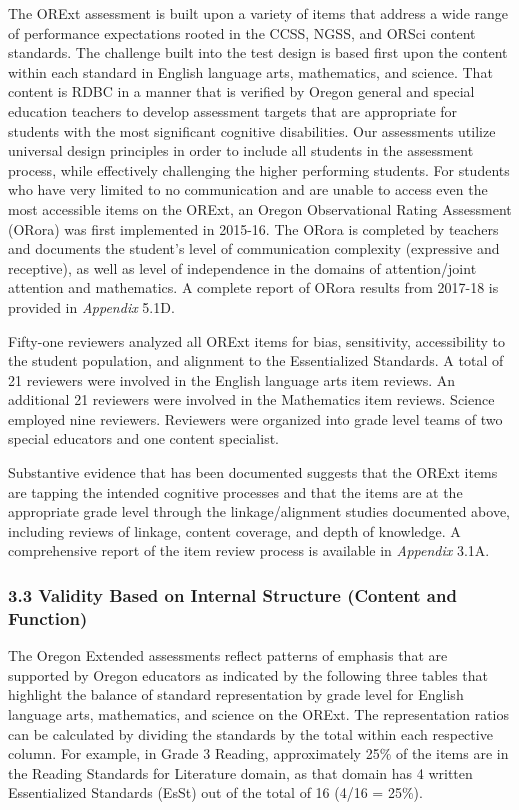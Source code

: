 \documentclass[]{article}
\begin{document}
The ORExt assessment is built upon a variety of items that address a
wide range of performance expectations rooted in the CCSS, NGSS, and
ORSci content standards. The challenge built into the test design is
based first upon the content within each standard in English language
arts, mathematics, and science. That content is RDBC in a manner that is
verified by Oregon general and special education teachers to develop
assessment targets that are appropriate for students with the most
significant cognitive disabilities. Our assessments utilize universal
design principles in order to include all students in the assessment
process, while effectively challenging the higher performing students.
For students who have very limited to no communication and are unable to
access even the most accessible items on the ORExt, an Oregon
Observational Rating Assessment (ORora) was first implemented in
2015-16. The ORora is completed by teachers and documents the student's
level of communication complexity (expressive and receptive), as well as
level of independence in the domains of attention/joint attention and
mathematics. A complete report of ORora results from 2017-18 is provided
in \emph{Appendix} 5.1D.

Fifty-one reviewers analyzed all ORExt items for bias, sensitivity,
accessibility to the student population, and alignment to the
Essentialized Standards. A total of 21 reviewers were involved in the
English language arts item reviews. An additional 21 reviewers were
involved in the Mathematics item reviews. Science employed nine
reviewers. Reviewers were organized into grade level teams of two
special educators and one content specialist.

Substantive evidence that has been documented suggests that the ORExt
items are tapping the intended cognitive processes and that the items
are at the appropriate grade level through the linkage/alignment studies
documented above, including reviews of linkage, content coverage, and
depth of knowledge. A comprehensive report of the item review process is
available in \emph{Appendix} 3.1A.

\subsubsection{3.3 Validity Based on Internal Structure (Content and
Function)}\label{validity-based-on-internal-structure-content-and-function}

The Oregon Extended assessments reflect patterns of emphasis that are
supported by Oregon educators as indicated by the following three tables
that highlight the balance of standard representation by grade level for
English language arts, mathematics, and science on the ORExt. The
representation ratios can be calculated by dividing the standards by the
total within each respective column. For example, in Grade 3 Reading,
approximately 25\% of the items are in the Reading Standards for
Literature domain, as that domain has 4 written Essentialized Standards
(EsSt) out of the total of 16 (4/16 = 25\%).
\end{document}
